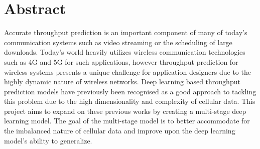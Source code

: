 \chapter{Abstract}
Accurate throughput prediction is an important component of many of today's communication systems such as video streaming or the scheduling of large downloads. Today's world heavily utilizes wireless communication technologies such as 4G and 5G for such applications, however throughput prediction for wireless systems presents a unique challenge for application designers due to the highly dynamic nature of wireless networks. Deep learning based throughput prediction models have previously been recognised as a good approach to tackling this problem due to the high dimensionality and complexity of cellular data. This project aims to expand on these previous works by creating a multi-stage deep learning model. The goal of the multi-stage model is to better accommodate for the imbalanced nature of cellular data and improve upon the deep learning model's ability to generalize.